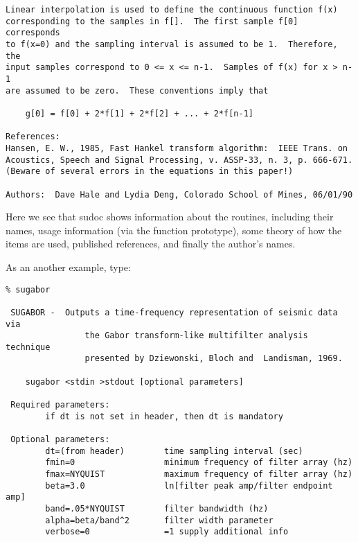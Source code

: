 {{{\begin{verbatim}
Linear interpolation is used to define the continuous function f(x)
corresponding to the samples in f[].  The first sample f[0] corresponds
to f(x=0) and the sampling interval is assumed to be 1.  Therefore, the
input samples correspond to 0 <= x <= n-1.  Samples of f(x) for x > n-1
are assumed to be zero.  These conventions imply that 

	g[0] = f[0] + 2*f[1] + 2*f[2] + ... + 2*f[n-1]

References:
Hansen, E. W., 1985, Fast Hankel transform algorithm:  IEEE Trans. on
Acoustics, Speech and Signal Processing, v. ASSP-33, n. 3, p. 666-671.
(Beware of several errors in the equations in this paper!)

Authors:  Dave Hale and Lydia Deng, Colorado School of Mines, 06/01/90
\end{verbatim}}\noindent

Here we see that sudoc 
shows information about the routines, including their names, usage
information (via the function prototype), some theory of how the
items are used, published references, and finally the author's names.

As an another example, type:
{\small \begin{verbatim}
% sugabor
                                                                        
 SUGABOR -  Outputs a time-frequency representation of seismic data via
                the Gabor transform-like multifilter analysis technique 
                presented by Dziewonski, Bloch and  Landisman, 1969.    
                                                                        
    sugabor <stdin >stdout [optional parameters]                        
                                                                        
 Required parameters:                                                   
        if dt is not set in header, then dt is mandatory                
                                                                        
 Optional parameters:                                                   
        dt=(from header)        time sampling interval (sec)            
        fmin=0                  minimum frequency of filter array (hz)  
        fmax=NYQUIST            maximum frequency of filter array (hz)  
        beta=3.0                ln[filter peak amp/filter endpoint amp] 
        band=.05*NYQUIST        filter bandwidth (hz)                   
        alpha=beta/band^2       filter width parameter                  
        verbose=0               =1 supply additional info               
                                                                        

\end{verbatim}}}}
